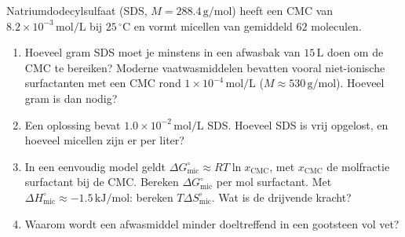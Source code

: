 \begin{oefening}
Natriumdodecylsulfaat (SDS, \(M = 288.4\,\mathrm{g/mol}\)) heeft een CMC van \(8.2\times10^{-3}\,\mathrm{mol/L}\) bij \(25\,^\circ\mathrm{C}\) en vormt micellen van gemiddeld \(62\) moleculen.

\begin{enumerate}
\item[(a)]
  Hoeveel gram SDS moet je minstens in een afwasbak van \(15\,\mathrm{L}\) doen om de CMC te bereiken? Moderne vaatwasmiddelen bevatten vooral niet-ionische surfactanten met een CMC rond \(1\times10^{-4}\,\mathrm{mol/L}\) (\(M \approx 530\,\mathrm{g/mol}\)). Hoeveel gram is dan nodig?
\item[(b)]
  Een oplossing bevat \(1.0\times10^{-2}\,\mathrm{mol/L}\) SDS. Hoeveel SDS is vrij opgelost, en hoeveel micellen zijn er per liter?
\item[(c)]
  In een eenvoudig model geldt \(\Delta G^\circ_{\text{mic}} \approx RT\ln x_{\text{CMC}}\), met \(x_{\text{CMC}}\) de molfractie surfactant bij de CMC. Bereken \(\Delta G^\circ_{\text{mic}}\) per mol surfactant. Met \(\Delta H^\circ_{\text{mic}} \approx -1.5\,\mathrm{kJ/mol}\): bereken \(T\Delta S^\circ_{\text{mic}}\). Wat is de drijvende kracht?
\item[(d)]
  Waarom wordt een afwasmiddel minder doeltreffend in een gootsteen vol vet?
\end{enumerate}
\end{oefening}
